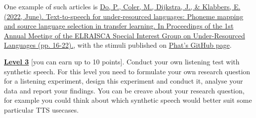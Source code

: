 \documentclass{../labbook}
\begin{document}
One example of such articles is \href{https://aclanthology.org/2022.sigul-1.3.pdf}{Do, P., Coler, M., Dijkstra, J., \& Klabbers, E. (2022, June). Text-to-speech for under-resourced languages: Phoneme mapping and source language selection in transfer learning. In Proceedings of the 1st Annual Meeting of the ELRA\/ISCA Special Interest Group on Under-Resourced Languages (pp. 16-22).}, with the stimuli published on \href{https://phat-do.github.io/sigul22/}{Phat's GitHub page}.

\smallskip

\underline{\textbf{Level 3}} [you can earn up to 10 points]. Conduct your own listening test with synthetic speech. For this level you need to formulate your own research question for a listening experiment, design this experiment and conduct it, analyse your data and report your findings. You can be creave about your research question, for example you could think about which synthetic speech would better suit some particular TTS usecases.
\end{document}
